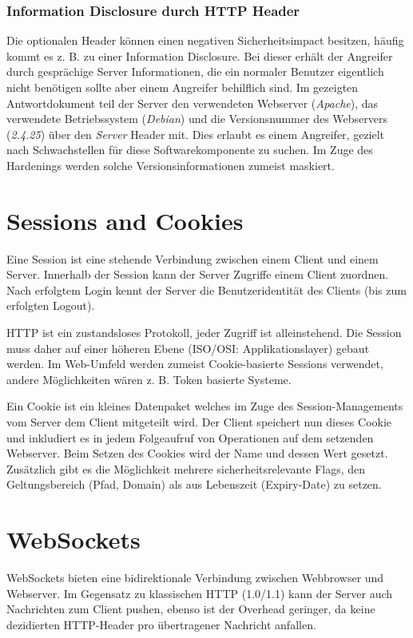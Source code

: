 \subsubsection{Information Disclosure durch HTTP Header}

Die optionalen Header können einen negativen Sicherheitsimpact besitzen, häufig kommt es z. B. zu einer Information Disclosure. Bei dieser erhält der Angreifer durch gesprächige Server Informationen, die ein normaler Benutzer eigentlich nicht benötigen sollte aber einem Angreifer behilflich sind. Im gezeigten Antwortdokument teil der Server den verwendeten Webserver (\textit{Apache}), das verwendete Betriebssystem (\textit{Debian}) und die Versionsnummer des Webservers (\textit{2.4.25}) über den \textit{Server} Header mit. Dies erlaubt es einem Angreifer, gezielt nach Schwachstellen für diese Softwarekomponente zu suchen. Im Zuge des Hardenings werden solche Versionsinformationen zumeist maskiert.

\section{Sessions and Cookies}

Eine Session ist eine stehende Verbindung zwischen einem Client und einem Server. Innerhalb der Session kann der Server Zugriffe einem Client zuordnen. Nach erfolgtem Login kennt der Server die Benutzeridentität des Clients (bis zum erfolgten Logout).

HTTP ist ein zustandsloses Protokoll, jeder Zugriff ist alleinstehend. Die Session muss daher auf einer höheren Ebene (ISO/OSI: Applikationslayer) gebaut werden. Im Web-Umfeld werden zumeist Cookie-basierte Sessions verwendet, andere Möglichkeiten wären z. B. Token basierte Systeme.

Ein Cookie ist ein kleines Datenpaket welches im Zuge des Session-Managements vom Server dem Client mitgeteilt wird. Der Client speichert nun dieses Cookie und inkludiert es in jedem Folgeaufruf von Operationen auf dem setzenden Webserver. Beim Setzen des Cookies wird der Name und dessen Wert gesetzt. Zusätzlich gibt es die Möglichkeit mehrere sicherheitsrelevante Flags, den Geltungsbereich (Pfad, Domain) als aus Lebenszeit (Expiry-Date) zu setzen.

\section{WebSockets} 

WebSockets bieten eine bidirektionale Verbindung zwischen Webbrowser und Webserver. Im Gegensatz zu klassischen HTTP (1.0/1.1) kann der Server auch Nachrichten zum Client pushen, ebenso ist der Overhead geringer, da keine dezidierten HTTP-Header pro übertragener Nachricht anfallen.

